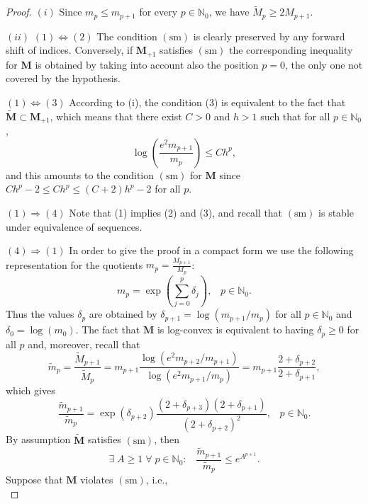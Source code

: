 \documentclass[12pt,a4paper]{article}
\newcommand{\N}{\mathbb{N}}
\newcommand{\M}{{\boldsymbol{M}}}
\newcommand{\sm}{\operatorname{(sm)}}
\theoremstyle{plain}
\theoremstyle{definition}
\numberwithin{equation}{section}
\begin{document}
\begin{proof}
$(i)$ Since $m_p\le m_{p+1}$ for every $p\in\N_0$, we have
$\widetilde{M}_p\ge 2M_{p+1}$.\par\noindent
$(ii)$ $(1)\Leftrightarrow(2)$ The condition $\sm$ is clearly preserved by any forward shift of indices. Conversely, if $\M_{+1}$ satisfies $\sm$ the corresponding inequality for $\M$ is obtained by taking into account also the position $p=0$, the only one not covered by the hypothesis.\par\noindent
$(1)\Leftrightarrow(3)$ According to (i), the condition (3) is equivalent to the fact that $\widetilde{\M}\subset\M_{+1}$, which means that there exist $C>0$ and $h>1$ such that for all $p\in\mathbb{N}_0$,
$$\log\left(\frac{e^2m_{p+1}}{m_p}\right)\le Ch^{p},
$$
and this amounts to the condition $\sm$ for $\M$ since
$Ch^{p}-2\le Ch^{p}\le (C+2)h^{p}-2$ for all $p$.\par\noindent
$(1)\Rightarrow(4)$ Note that (1) implies (2) and (3), and recall that $\sm$ is stable under equivalence of sequences.\par\noindent
$(4)\Rightarrow(1)$ In order to give the proof in a compact form we use the following representation for the quotients $m_p=\frac{M_{p+1}}{M_p}$:
\begin{equation}\label{eq.represent_m_p_delta_p}
m_p=\exp\left(\sum_{j=0}^p\delta_j\right),\;\;\;p\in\mathbb{N}_0.
\end{equation}
Thus the values $\delta_p$ are obtained by $\delta_{p+1}=\log(m_{p+1}/m_p)$ for all $p\in\mathbb{N}_0$ and $\delta_0=\log(m_0)$. The fact that $\M$ is log-convex is equivalent to having $\delta_p\ge 0$ for all $p$ and, moreover, recall that
$$\widetilde{m}_p=\frac{\widetilde{M}_{p+1}}{\widetilde{M}_p}= m_{p+1}\frac{\log(e^2m_{p+2}/m_{p+1})}{\log(e^2m_{p+1}/m_p)}= m_{p+1}\frac{2+\delta_{p+2}}{2+\delta_{p+1}},$$
which gives
\begin{equation}\label{smviolatelemmaequ1}
\frac{\widetilde{m}_{p+1}}{\widetilde{m}_p}= \exp(\delta_{p+2}) \frac{(2+\delta_{p+3})(2+\delta_{p+1})}{(2+\delta_{p+2})^2},\;\;\;p\in\mathbb{N}_0.
\end{equation}
By assumption $\widetilde{\M}$ satisfies $\sm$, then
\begin{equation}\label{smviolatelemmaequ3}
\exists\;A\ge 1\;\forall\;p\in\mathbb{N}_0:\;\;\;\frac{\widetilde{m}_{p+1}}{\widetilde{m}_p}\le e^{A^{p+1}}.
\end{equation}
Suppose that $\M$ violates $\sm$, i.e.,
\begin{equation}\label{smviolatelemmaequ2}

\end{equation}
\end{proof}
\end{document}
